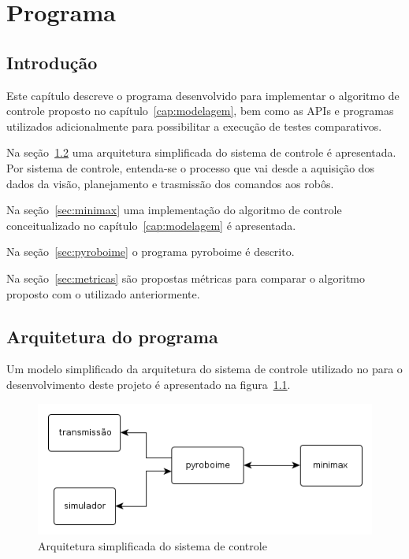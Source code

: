 \chapter{Programa}\label{cap:programa}

\section{Introdução}

Este capítulo descreve o programa desenvolvido para implementar o algoritmo de
controle proposto no capítulo~\ref{cap:modelagem}, bem como as APIs e programas
utilizados adicionalmente para possibilitar a execução de testes comparativos.

Na seção~\ref{sec:arq_prog} uma arquitetura simplificada do sistema de controle é apresentada.
Por sistema de controle, entenda-se o processo que vai desde a aquisição dos
dados da visão, planejamento e trasmissão dos comandos aos robôs.

Na seção~\ref{sec:minimax} uma implementação do algoritmo de controle conceitualizado no
capítulo~\ref{cap:modelagem} é apresentada.

Na seção~\ref{sec:pyroboime} o programa pyroboime é descrito.

Na seção~\ref{sec:metricas} são propostas métricas para comparar o algoritmo
proposto com o utilizado anteriormente.

\section{Arquitetura do programa}\label{sec:arq_prog}

Um modelo simplificado da arquitetura do sistema de controle utilizado no para
o desenvolvimento deste projeto é apresentado na figura~\ref{fig:arq_prog}.

\begin{figure}
  \centering
  \includegraphics[width=0.8 \linewidth]{img/arq_geral_prog}
  \caption{Arquitetura simplificada do sistema de controle}\label{fig:arq_prog}
\end{figure}

